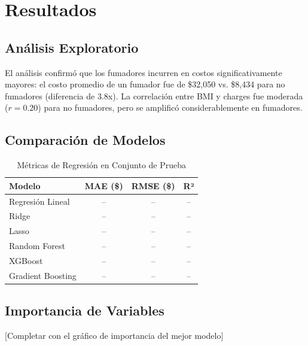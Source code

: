 \section{Resultados}

\subsection{Análisis Exploratorio}
El análisis confirmó que los fumadores incurren en costos
significativamente mayores: el costo promedio de un fumador fue de
\$32,050 vs. \$8,434 para no fumadores (diferencia de 3.8x).
La correlación entre BMI y charges fue moderada ($r = 0.20$) para
no fumadores, pero se amplificó considerablemente en fumadores.

\subsection{Comparación de Modelos}
\begin{table}[H]
\centering
\caption{Métricas de Regresión en Conjunto de Prueba}
\label{tab:reg_resultados}
\begin{tabular}{lccc}
\toprule
\textbf{Modelo} & \textbf{MAE (\$)} & \textbf{RMSE (\$)} & \textbf{R²} \\
\midrule
Regresión Lineal  & --      & --      & -- \\
Ridge             & --      & --      & -- \\
Lasso             & --      & --      & -- \\
Random Forest     & --      & --      & -- \\
XGBoost           & --      & --      & -- \\
Gradient Boosting & --      & --      & -- \\
\bottomrule
\end{tabular}
\end{table}

\subsection{Importancia de Variables}
[Completar con el gráfico de importancia del mejor modelo]
